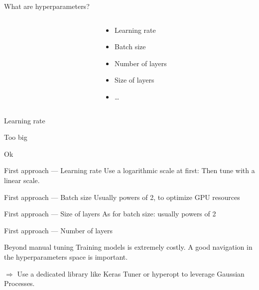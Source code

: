 \begin{frame}{What are hyperparameters?}
  \begin{columns}
    \begin{column}[c]{0.5\textwidth}
    \end{column}
    \begin{column}[c]{0.5\textwidth}
      \begin{itemize}
        \item Learning rate
        \item Batch size
        \item Number of layers
        \item Size of layers
        \item …
      \end{itemize}
    \end{column}
  \end{columns}
\end{frame}

\begin{frame}{Learning rate}
  \begin{minipage}{0.49\textwidth}
    \centering
    Too big
  \end{minipage}\hfill
  \begin{minipage}{0.49\linewidth}
    \centering
    Ok
  \end{minipage}\hfill

\end{frame}

\begin{frame}{First approach --- Learning rate}
  Use a logarithmic scale at first:
  Then tune with a linear scale.
\end{frame}

\begin{frame}{First approach --- Batch size}
  Usually powers of 2, to optimize GPU resources
\end{frame}

\begin{frame}{First approach --- Size of layers}
  As for batch size: usually powers of 2
\end{frame}

\begin{frame}{First approach --- Number of layers}
\end{frame}

\begin{frame}{Beyond manual tuning}
  Training models is extremely costly.
  A good navigation in the hyperparameters space is important.

  $\Rightarrow$ Use a dedicated library like Keras Tuner or hyperopt to leverage Gaussian Processes.
\end{frame}
